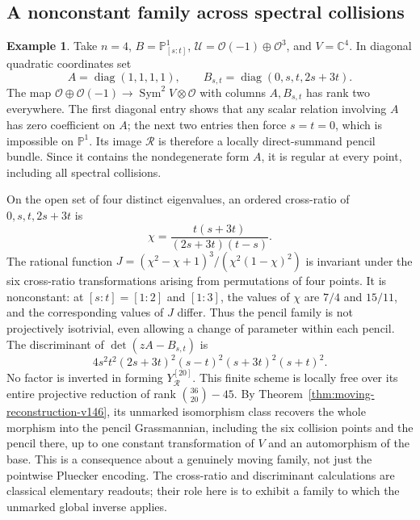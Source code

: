 \documentclass[11pt,reqno]{amsart}
\numberwithin{equation}{section}
\theoremstyle{definition}\newtheorem{definition}[theorem]{Definition}
\newtheorem{example}[theorem]{Example}
\theoremstyle{remark}\newtheorem{remark}[theorem]{Remark}
\newcommand{\C}{\mathbb C}\newcommand{\Q}{\mathbb Q}
\newcommand{\Pj}{\mathbb P}\newcommand{\A}{\mathbb A}
\newcommand{\OO}{\mathcal O}\newcommand{\II}{\mathcal I}
\DeclareMathOperator{\Sym}{Sym}\DeclareMathOperator{\Gr}{Gr}
\begin{document}
\subsection{A nonconstant family across spectral collisions}
\begin{example}\label{ex:nonconstant-pencil-v146}
Take \(n=4\), \(B=\Pj^1_{[s:t]}\),
\(\mathcal U=\OO(-1)\oplus\OO^3\), and \(V=\C^4\).  In diagonal
quadratic coordinates set
\[
 A=\operatorname{diag}(1,1,1,1),\qquad
 B_{s,t}=\operatorname{diag}(0,s,t,2s+3t).
\]
The map \(\OO\oplus\OO(-1)\to\Sym^2V\otimes\OO\) with columns
\(A,B_{s,t}\) has rank two everywhere.  The first diagonal entry
shows that any scalar relation involving \(A\) has zero coefficient
on \(A\); the next two entries then force \(s=t=0\), which is
impossible on \(\Pj^1\).  Its image \(\mathcal R\) is therefore a
locally direct-summand pencil bundle.  Since it contains the
nondegenerate form \(A\), it is regular at every point, including
all spectral collisions.

On the open set of four distinct eigenvalues, an ordered cross-ratio
of \(0,s,t,2s+3t\) is
\[
 \chi=\frac{t(s+3t)}{(2s+3t)(t-s)}.
\]
The rational function
\(J=(\chi^2-\chi+1)^3/(\chi^2(1-\chi)^2)\)
is invariant under the six cross-ratio transformations arising from
permutations of four points.  It is nonconstant: at \([s:t]=[1:2]\)
and \([1:3]\), the values of \(\chi\) are \(7/4\) and \(15/11\),
and the corresponding values of \(J\) differ.  Thus the pencil
family is not projectively isotrivial, even allowing a change of
parameter within each pencil.  The discriminant of
\(\det(zA-B_{s,t})\) is
\begin{equation}\label{eq:moving-discriminant-v146}
 4s^2t^2(2s+3t)^2(s-t)^2(s+3t)^2(s+t)^2.
\end{equation}
No factor is inverted in forming \(Y_{\mathcal R}^{[20]}\).
This finite scheme is locally free over its entire projective
reduction of rank \(\binom{36}{20}-45\).
By Theorem~\ref{thm:moving-reconstruction-v146}, its unmarked
isomorphism class recovers the whole morphism into the pencil
Grassmannian, including the six collision points and the pencil
there, up to one constant transformation of \(V\) and an automorphism
of the base.  This is a consequence about a genuinely moving family,
not just the pointwise Pluecker encoding.  The cross-ratio and
discriminant calculations are classical elementary readouts; their
role here is to exhibit a family to which the unmarked global inverse
applies.
\end{example}
\end{document}
